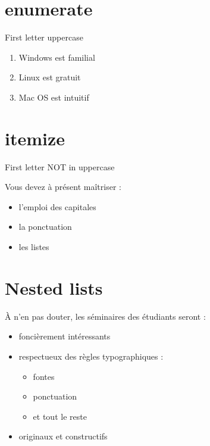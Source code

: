 \documentclass{article}
\newcommand{\JeTPeriod}{\mode<article>{.}}
\newcommand{\JeTSemicolon}{\mode<article>{;}}
\newcommand{\JeTColon}{\mode<article>{,}}
\begin{document}
\section{enumerate}

\begin{frame}

First letter uppercase 

\begin{enumerate}
\item Windows est familial \JeTSemicolon	%
\item Linux est gratuit \JeTSemicolon 		%
\item Mac OS est intuitif\JeTPeriod		%
\end{enumerate}

\end{frame}

\section{itemize}

\begin{frame}
First letter NOT in uppercase 

Vous devez à présent maîtriser :
\begin{itemize}
\item l'emploi des capitales \JeTSemicolon 	%
\item la ponctuation \JeTSemicolon			%
\item les listes\JeTPeriod				%
\end{itemize}
\end{frame}

\section{Nested lists}

\begin{frame}
À n'en pas douter, les séminaires des étudiants seront :
\begin{itemize}

\item foncièrement intéressants \JeTSemicolon 	%
\item respectueux des règles typographiques :
\begin{itemize}
\item fontes\JeTColon						%
\item ponctuation\JeTColon					%
\item et tout le reste \JeTSemicolon			%
\end{itemize}
\item originaux et constructifs\JeTPeriod	%

\end{itemize}
\end{frame}
\end{document}
